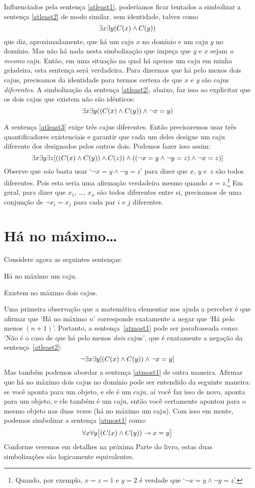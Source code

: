 Influenciados pela sentença \ref{atleast1}, poderíamos ficar tentados a simbolizar a sentença \ref{atleast2} de modo similar, sem identidade, talvez como
$$\exists x \exists y(\mathord{C}(x) \wedge \mathord{C}(y))$$
que diz, aproximadamente, que há um caju $x$ no domínio e um caju $y$ no domínio.
Mas não há nada nesta simbolização que impeça que $y$ e $x$ sejam \emph{o mesmo} caju.
Então, em uma situação na qual há apenas um caju em minha geladeira, esta sentença será verdadeira.
Para dizermos que há pelo menos dois cajus, precisamos da identidade para termos  certeza de que $x$ e $y$ são cajus \emph{diferentes}.
A simbolização da sentença \ref{atleast2}, abaixo, faz isso ao explicitar que os dois cajus que existem não são idênticos:
$$\exists x \exists y((\mathord{C}(x) \wedge \mathord{C}(y)) \wedge \neg x = y)$$

A sentença \ref{atleast3} exige três cajus diferentes.
Então precisaremos usar três quantificadores existenciais  e  garantir que cada um deles designe um caju diferente dos designados pelos outros dois.
Podemos fazer isso assim:
\[
	\exists x \exists y\exists z[((\mathord{C}(x) \wedge \mathord{C}(y)) \wedge \mathord{C}(z)) \wedge ((\neg x = y \wedge \neg y = z) \wedge \neg x = z)]
\]
Observe que \emph{não} basta usar `$\lnot x = y \land \lnot y = z$' para dizer que $x$, $y$ e~$z$ são todos diferentes.
Pois esta seria uma afirmação verdadeira mesmo quando $x = z$.\footnote{
	Quando, por exemplo, $x=z=1$ e $y=2$ é verdade que `$\lnot x = y \land \lnot y = z$'.}
Em geral, para dizer que $x_1$, \dots, $x_n$ são todos diferentes entre si, precisamos de uma conjunção de $\lnot x_i = x_j$ para cada par $i$ e $j$ diferentes.


\section{Há no máximo\ldots}\label{s:HaNoMaximo}
Considere agora as seguintes sentenças:
\begin{earg}
	\item[\ex{atmost1}] Há no máximo um caju.
	\item[\ex{atmost2}] Existem no máximo dois cajus.
\end{earg}
Uma primeira observação que a matemática elementar nos ajuda a perceber é que afirmar que `Há no máximo $n$' corresponde exatamente a negar que `Há pelo menos $(n+1)$'.
Portanto, a sentença~\ref{atmost1} pode ser parafraseada como:
`Não é o caso de que há pelo menos \emph{dois} cajus', que é exatamente a negação da sentença~\ref{atleast2}:
$$\neg \exists x \exists y[(\mathord{C}(x) \wedge \mathord{C}(y)) \wedge \neg x = y]$$
Mas também podemos abordar a sentença \ref{atmost1} de outra maneira.
Afirmar que há no máximo dois cajus no domínio pode ser entendido da seguinte maneira:
se você aponta para um objeto, e ele é um caju, aí você faz isso de novo, aponta para um objeto, e ele também é um caju, então você certamente apontou para o mesmo objeto nas duas vezes (há no máximo um caju).
Com isso em mente, podemos simbolizar a sentença \ref{atmost1} como:
$$\forall x\forall y\bigl[(\mathord{C}(x) \wedge \mathord{C}(y)) \rightarrow x=y\bigr]$$
Conforme veremos em detalhes na próxima Parte do livro, estas duas simbolizações são logicamente equivalentes.

